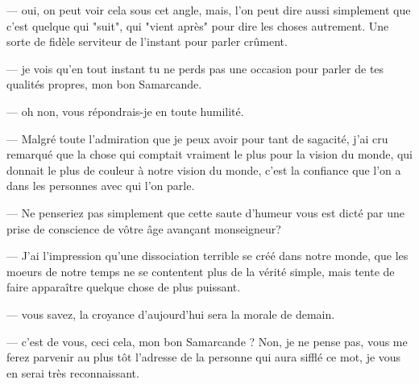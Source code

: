 --- oui, on peut voir cela sous cet angle, mais, l'on peut dire aussi
simplement que c'est quelque qui "suit", qui "vient après" pour dire
les choses autrement. Une sorte de fidèle serviteur de l'instant pour
parler crûment.

--- je vois qu'en tout instant tu ne perds pas une occasion pour
parler de tes qualités propres, mon bon Samarcande.

--- oh non, vous répondrais-je en toute humilité.

--- Malgré toute l'admiration que je peux avoir pour tant de sagacité,
j'ai cru remarqué que la chose qui comptait vraiment le plus pour la
vision du monde, qui donnait le plus de couleur à notre vision du
monde, c'est la confiance que l'on a dans les personnes avec qui l'on
parle.

--- Ne penseriez pas simplement que cette saute d'humeur vous est dicté
par une prise de conscience de vôtre âge avançant monseigneur?

--- J'ai l'impression qu'une dissociation terrible se créé dans notre
monde, que les moeurs de notre temps ne se contentent plus de la
vérité simple, mais tente de faire apparaître quelque chose de plus
puissant. 

--- vous savez, la croyance d'aujourd'hui sera la morale de demain.

--- c'est de vous, ceci cela, mon bon Samarcande ? Non, je ne pense
pas, vous me ferez parvenir au plus tôt l'adresse de la personne qui
aura sifflé ce mot, je vous en serai très reconnaissant.

